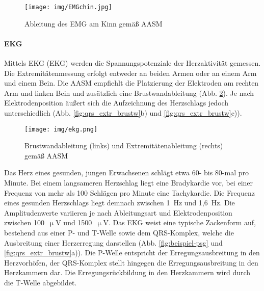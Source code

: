 \begin{figure}[H]
	\centering
	\texttt{[image: img/EMGchin.jpg]}
	\caption[Elektrodenpositionen des \acs{EMG}]{Ableitung des \acs{EMG} am Kinn gemäß \acs{AASM} \parencite{leroux_handbuch_2009}}
	\label{fig:emgchin}
\end{figure}

\paragraph{\acs{EKG}}
Mittels \acl{EKG} (\acs{EKG}) werden die Spannungspotenziale der Herzaktivität gemessen. Die Extremitätenmessung erfolgt entweder an beiden Armen oder an einem Arm und einem Bein. Die \acs{AASM} empfiehlt die Platzierung der Elektroden am rechten Arm und linken Bein und zusätzlich eine Brustwandableitung (Abb. \ref{fig:ekg}). Je nach Elektrodenposition äußert sich die Aufzeichnung des Herzschlags jedoch unterschiedlich (Abb. \ref{fig:qrs_extr_brustw}b) und \ref{fig:qrs_extr_brustw}c)). \parencite{bamberger_1x1_2015, iber_aasm_2007}

\begin{figure}[H]
	\centering
	\texttt{[image: img/ekg.png]}
	\caption[Elektrodenpositionen des \acs{EKG}]{Brustwandableitung (links) und Extremitätenableitung (rechts) gemäß \acs{AASM} \parencite{leroux_handbuch_2009}}
	\label{fig:ekg}
\end{figure}

Das Herz eines gesunden, jungen Erwachsenen schlägt etwa 60- bis 80-mal pro Minute. Bei einem langsameren Herzschlag liegt eine Bradykardie vor, bei einer Frequenz von mehr als 100 Schlägen pro Minute eine Tachykardie. Die Frequenz eines gesunden Herzschlags liegt demnach zwischen 1~Hz und 1,6~Hz. Die Amplitudenwerte variieren je nach Ableitungsart und Elektrodenposition zwischen 100~$\upmu$V und 1500~$\upmu$V. Das \acs{EKG} weist eine typische Zackenform auf, bestehend aus einer P- und T-Welle sowie dem QRS-Komplex, welche die Ausbreitung einer Herzerregung darstellen (Abb. \ref{fig:beispiel-psg} und \ref{fig:qrs_extr_brustw}a)). Die P-Welle entspricht der Erregungsausbreitung in den Herzvorhöfen, der QRS-Komplex stellt hingegen die Erregungsausbreitung in den Herzkammern dar. Die Erregungsrückbildung in den Herzkammern wird durch die T-Welle abgebildet. \parencite{bamberger_1x1_2015, oresick_kania_ekg_2016}\\

